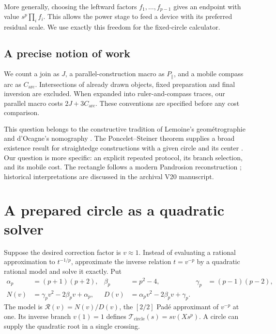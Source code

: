\documentclass[11pt,a4paper]{article}
\newcommand{\map}[1]{\mathcal T_{\mathrm{#1}}}
\begin{document}
More generally, choosing the leftward factors $f_1,\ldots,f_{p-1}$ gives an endpoint with value $s^p\prod_i f_i$. This allows the power stage to feed a device with its preferred residual scale. We use exactly this freedom for the fixed-circle calculator.

\subsection{A precise notion of work}
We count a join as $J$, a parallel-construction macro as $P_{\parallel}$, and a mobile compass arc as $C_{\mathrm{arc}}$. Intersections of already drawn objects, fixed preparation and final inversion are excluded. When expanded into ruler-and-compass traces, our parallel macro costs $2J+3C_{\mathrm{arc}}$. These conventions are specified before any cost comparison.

This question belongs to the constructive tradition of Lemoine's geom\'etrographie and d'Ocagne's nomography \cite{lemoine1902,docagne1925}. The Poncelet--Steiner theorem supplies a broad existence result for straightedge constructions with a given circle and its center \cite{steiner1833}. Our question is more specific: an explicit repeated protocol, its branch selection, and its mobile cost. The rectangle follows a modern Pandrosion reconstruction \cite{launayPandrosion}; historical interpretations are discussed in the archival V20 manuscript.
\clearpage

\section{A prepared circle as a quadratic solver}\label{sec:circle}
Suppose the desired correction factor is $v\approx1$. Instead of evaluating a rational approximation to $t^{-1/p}$, approximate the inverse relation $t=v^{-p}$ by a quadratic rational model and solve it exactly. Put
\begin{align}
 \alpha_p&=(p+1)(p+2),&\beta_p&=p^2-4,&\gamma_p&=(p-1)(p-2),\nonumber\\
 N(v)&=\gamma_pv^2-2\beta_pv+\alpha_p,&
 D(v)&=\alpha_pv^2-2\beta_pv+\gamma_p.\label{eq:model}
\end{align}
The model is $\mathcal R(v)=N(v)/D(v)$, the $[2/2]$ Pad\'e approximant of $v^{-p}$ at one. Its inverse branch $v(1)=1$ defines $\map{circle}(s)=sv(Xs^p)$. A circle can supply the quadratic root in a single crossing.
\end{document}
